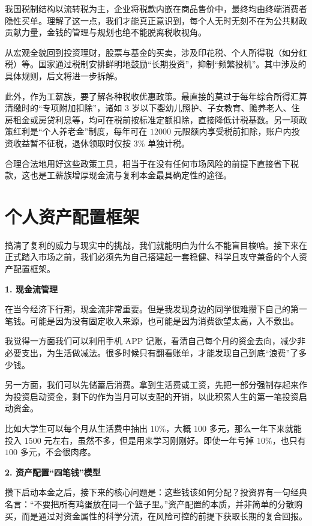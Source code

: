 \documentclass[12pt,openany]{book}
\newcommand{\subhead}[1]{%
    \par\vspace{0.5\baselineskip}%
    \noindent\textbf{#1}\par%
    \vspace{0.5\baselineskip}%
}
\begin{document}
我国税制结构以流转税为主，企业将税款内嵌在商品售价中，最终均由终端消费者隐性买单。理解了这一点，我们才能真正意识到，每个人无时无刻不在为公共财政贡献力量，金钱的管理与规划也绝不能脱离税收视角。

从宏观全貌回到投资理财，股票与基金的买卖，涉及印花税、个人所得税（如分红税）等。国家通过税制安排鲜明地鼓励“长期投资”，抑制“频繁投机”。其中涉及的具体规则，后文将进一步拆解。

此外，作为工薪族，要了解各种税收优惠政策。最直接的莫过于每年综合所得汇算清缴时的“专项附加扣除”，诸如 3 岁以下婴幼儿照护、子女教育、赡养老人、住房租金或房贷利息等，均可在税前按标准定额扣除，直接降低计税基数。另一项政策红利是“个人养老金”制度，每年可在 $12000$ 元限额内享受税前扣除，账户内投资收益暂不征税，退休领取时仅按 $3\%$ 单独计税。

合理合法地用好这些政策工具，相当于在没有任何市场风险的前提下直接省下税款，这也是工薪族增厚现金流与复利本金最具确定性的途径。

\section{个人资产配置框架}

搞清了复利的威力与现实中的挑战，我们就能明白为什么不能盲目梭哈。接下来在正式踏入市场之前，我们必须先为自己搭建起一套稳健、科学且攻守兼备的个人资产配置框架。

\subhead{1. 现金流管理}

在当今经济下行期，现金流非常重要。但是我发现身边的同学很难攒下自己的第一笔钱。可能是因为没有固定收入来源，也可能是因为消费欲望太高，入不敷出。

我觉得一方面我们可以利用手机 APP 记账，看清自己每个月的资金去向，减少非必要支出，为生活做减法。很多时候只有翻看账单，才能发现自己到底“浪费”了多少钱。

另一方面，我们可以先储蓄后消费。拿到生活费或工资，先把一部分强制存起来作为投资启动资金，剩下的作为当月可以支配的开销，以此积累人生的第一笔投资启动资金。

比如大学生可以每个月从生活费中抽出 $10\%$，大概 $100$ 多元，那么一年下来就能投入 $1500$ 元左右，虽然不多，但是用来学习刚刚好。即使一年亏掉 $10\%$，也只有 $100$ 多元，不会很肉疼。

\subhead{2. 资产配置“四笔钱”模型}

攒下启动本金之后，接下来的核心问题是：这些钱该如何分配？投资界有一句经典名言：“不要把所有鸡蛋放在同一个篮子里。”资产配置的本质，并非简单的分散购买，而是通过对资金属性的科学分流，在风险可控的前提下获取长期的复合回报。
\end{document}
